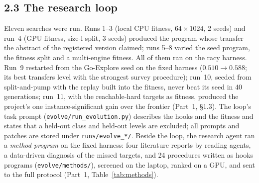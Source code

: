 \subsection*{2.3 The research loop}
Eleven searches were run. Runs 1--3 (local CPU fitness, $64\times1024$, 2 seeds) and run~4 (GPU fitness, size-l split, 3 seeds) produced the program
whose transfer the abstract of the registered version claimed; runs 5--8 varied the seed program, the fitness split and a multi-engine fitness.
All of them ran on the racy harness. Run~9 restarted from the Go-Explore seed on the fixed harness ($0.510 \to 0.588$; its best transfers level with the strongest survey procedure); run~10, seeded from split-and-pump with the replay built into the fitness, never beat its seed in 40 generations; run~11, with the reachable-hard targets as fitness, produced the project's one instance-significant gain over the frontier (Part~1, \S1.3). The loop's task prompt
(\texttt{evolve/run\_evolution.py}) describes the hooks and the fitness and states that a held-out class and held-out levels are excluded;
all prompts and patches are stored under \texttt{runs/evolve\_*/}. Beside the loop, the research agent ran a \emph{method program} on the fixed
harness: four literature reports by reading agents, a data-driven diagnosis of the missed targets, and 24 procedures written as hooks programs
(\texttt{evolve/methods/}), screened on the laptop, ranked on a GPU, and sent to the full protocol (Part~1, Table~\ref{tab:methods}).

